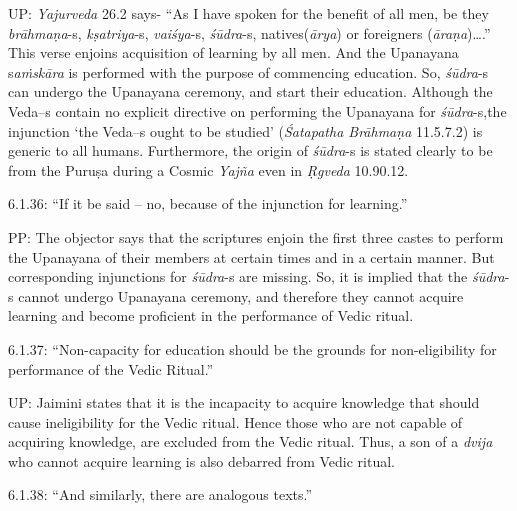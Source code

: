 UP: \textit{Yajurveda} 26.2 says- “As I have spoken for the benefit of all men, be they \textit{brāhmaṇa}-s, \textit{kṣatriya}-s, \textit{vaiśya}-s, \textit{śūdra}-s, natives(\textit{ārya}) or foreigners (\textit{āraṇa})….” This verse enjoins acquisition of learning by all men. And the Upanayana s\textit{aṁskāra} is performed with the purpose of commencing education. So, \textit{śūdra}-s can undergo the Upanayana ceremony, and start their education. Although the Veda--s contain no explicit directive on performing the Upanayana for \textit{śūdra}-s,\break the injunction ‘the Veda--s ought to be studied’ (\textit{Śatapatha Brāhmaṇa} 11.5.7.2) is generic to all humans. Furthermore, the origin of \textit{śūdra}-s is stated clearly to be from the Puruṣa during a Cosmic \textit{Yajña} even in \textit{Ṛgveda} 10.90.12.

6.1.36: “If it be said – no, because of the injunction for learning.”

PP: The objector says that the scriptures enjoin the first three castes to perform the Upanayana of their members at certain times and in a certain manner. But corresponding injunctions for \textit{śūdra}-s are missing. So, it is implied that the \textit{śūdra}-s cannot undergo Upanayana ceremony, and therefore they cannot acquire learning and become proficient in the performance of Vedic ritual.

6.1.37: “Non-capacity for education should be the grounds for non-eligibility for performance of the Vedic Ritual.”

\newpage

UP: Jaimini states that it is the incapacity to acquire knowledge that should cause ineligibility for the Vedic ritual. Hence those who are not capable of acquiring knowledge, are excluded from the Vedic ritual. Thus, a son of a \textit{dvija }who cannot acquire learning is also debarred from Vedic ritual.

6.1.38: “And similarly, there are analogous texts.”

